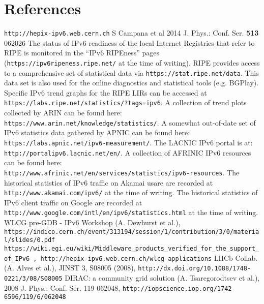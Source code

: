 \section*{References}

\begin{thebibliography}{1}
 {\tt http://hepix-ipv6.web.cern.ch}
 S Campana et al 2014 J. Phys.: Conf. Ser. {\bf513} 062026
 The status of IPv6 readiness of the local Internet Registries
that refer to RIPE is monitored in the ``IPv6 RIPEness'' pages ({\tt https://ipv6ripeness.ripe.net/} at the time of writing). 
 RIPE provides access to a comprehensive set of statistical
data via {\tt https://stat.ripe.net/data}. This data set is also used for
the online diagnostics and statistical tools (e.g. BGPlay). 
 Specific
IPv6 trend graphs for the RIPE LIRs can be accessed at\\ {\tt https://labs.ripe.net/statistics/?tags=ipv6}.
 A collection of trend plots collected by ARIN
can be found here:\\ {\tt https://www.arin.net/knowledge/statistics/}.
 A somewhat out-of-date set of IPv6
statistics data gathered by APNIC can be found here:\\ {\tt https://labs.apnic.net/ipv6-measurement/}.
 The LACNIC IPv6 portal is at:\\ {\tt http://portalipv6.lacnic.net/en/}.
 A collection of AFRINIC IPv6 resources can be found here:\\  {\tt http://www.afrinic.net/en/services/statistics/ipv6-resources}.
 The historical statistics of IPv6 traffic on Akamai usare are recorded at {\tt http://www.akamai.com/ipv6/} at the time of writing.
 The historical statistics of IPv6 client traffic on Google are recorded at\\ {\tt http://www.google.com/intl/en/ipv6/statistics.html} at the time of writing.
 WLCG pre-GDB - IPv6 Workshop (A. Dewhurst et al.), {\tt https://indico.cern.ch/event/313194/session/1/contribution/3/0/material/slides/0.pdf}
  { \tt https://wiki.egi.eu/wiki/Middleware\_products\_verified\_for\_the\_support\_of\_IPv6 , http://hepix-ipv6.web.cern.ch/wlcg-applications}
 LHCb Collab. (A. Alves et al.), JINST 3, S08005 (2008), {\tt http://dx.doi.org/10.1088/1748-0221/3/08/S08005}
\bibitem {[DIRAC} DIRAC: a community grid solution (A. Tsaregorodtsev et al.), 2008 J. Phys.: Conf. Ser. 119 062048, {\tt http://iopscience.iop.org/1742-6596/119/6/062048}

\end{thebibliography}
